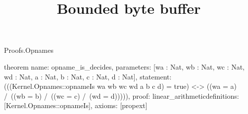 \begin{lexlean}{Proofs.Opnames}
\title{Bounded byte buffer}
\begin{semanticmodule}
theorem{
  name: opname_is_decides,
  parameters: [wa : Nat, wb : Nat, wc : Nat, wd : Nat, a : Nat, b : Nat, c : Nat, d : Nat],
  statement: (((Kernel.Opnames::opnameIs wa wb wc wd a b c d) = true) <-> ((wa = a) /\ ((wb = b) /\ ((wc = c) /\ (wd = d))))),
  proof: linear_arithmetic{definitions: [Kernel.Opnames::opnameIs]},
  axioms: [propext]
}
\end{semanticmodule}
\end{lexlean}
